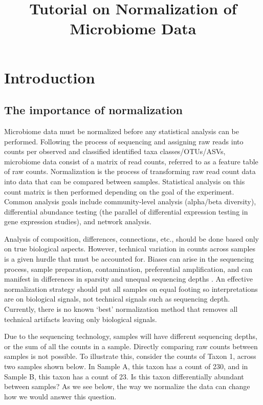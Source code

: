\documentclass[
]{book}
\title{Tutorial on Normalization of Microbiome Data}
\author{}
\date{\vspace{-2.5em}}
\begin{document}
\maketitle

{
\setcounter{tocdepth}{1}
\tableofcontents
}
\hypertarget{intro}{%
\chapter{Introduction}\label{intro}}

\hypertarget{the-importance-of-normalization}{%
\section{The importance of normalization}\label{the-importance-of-normalization}}

Microbiome data must be normalized before any statistical analysis can be performed. Following the process of sequencing and assigning raw reads into counts per observed and classified identified taxa classes/OTUs/ASVs, microbiome data consist of a matrix of read counts, referred to as a feature table of raw counts. Normalization is the process of transforming raw read count data into data that can be compared between samples. Statistical analysis on this count matrix is then performed depending on the goal of the experiment. Common analysis goals include community-level analysis (alpha/beta diversity), differential abundance testing (the parallel of differential expression testing in gene expression studies), and network analysis.

Analysis of composition, differences, connections, etc., should be done based only on true biological aspects. However, technical variation in counts across samples is a given hurdle that must be accounted for. Biases can arise in the sequencing process, sample preparation, contamination, preferential amplification, and can manifest in differences in sparsity and unequal sequencing depths \citep{salter2014}. An effective normalization strategy should put all samples on equal footing so interpretations are on biological signals, not technical signals such as sequencing depth. Currently, there is no known `best' normalization method that removes all technical artifacts leaving only biological signals.

Due to the sequencing technology, samples will have different sequencing depths, or the sum of all the counts in a sample. Directly comparing raw counts between samples is not possible. To illustrate this, consider the counts of Taxon 1, across two samples shown below. In Sample A, this taxon has a count of 230, and in Sample B, this taxon has a count of 23. Is this taxon differentially abundant between samples? As we see below, the way we normalize the data can change how we would answer this question.
\end{document}
